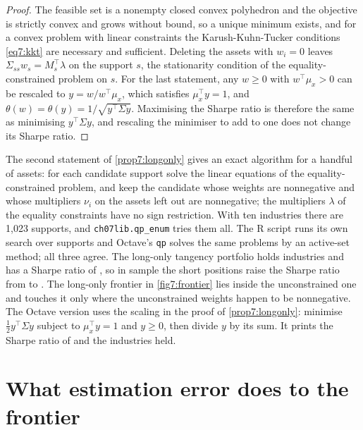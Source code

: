 \begin{chapterrefs}
\begin{proof}
The feasible set is a nonempty closed convex polyhedron and the objective is strictly convex and grows
without bound, so a unique minimum exists, and for a convex problem with linear constraints the
Karush-Kuhn-Tucker conditions \cref{eq7:kkt} are necessary and sufficient. Deleting the assets with
$w_i=0$ leaves $\Sigma_{ss}w_s=M_s^\top\lambda$ on the support $s$, the stationarity condition of the
equality-constrained problem on $s$. For the last statement, any $w\ge0$ with $w^\top\mu_x>0$ can be
rescaled to $y=w/w^\top\mu_x$, which satisfies $\mu_x^\top y=1$, and $\theta(w)=\theta(y)=1/\sqrt{y^\top\Sigma y}$.
Maximising the Sharpe ratio is therefore the same as minimising $y^\top\Sigma y$, and rescaling the
minimiser to add to one does not change its Sharpe ratio.
\end{proof}

The second statement of \cref{prop7:longonly} gives an exact algorithm for a handful of assets: for
each candidate support solve the linear equations of the equality-constrained problem, and keep the
candidate whose weights are nonnegative and whose multipliers $\nu_i$ on the assets left out are
nonnegative; the multipliers $\lambda$ of the equality constraints have no sign restriction. With ten industries there are 1,023
supports, and \texttt{ch07lib.qp\_enum} tries them all. The R script runs its own search over supports
and Octave's \texttt{qp} solves the same problems by an active-set method; all three agree. The
long-only tangency portfolio holds \frLoNword{} industries and has a Sharpe ratio of \frLoSR, so in
sample the short positions raise the Sharpe ratio from \frLoSR{} to \frTanSR. The long-only frontier in
\cref{fig7:frontier} lies inside the unconstrained one and touches it only where the unconstrained
weights happen to be nonnegative.
The Octave version uses the scaling in the proof of \cref{prop7:longonly}: minimise
$\frac12y^\top\Sigma y$ subject to $\mu_x^\top y=1$ and $y\ge0$, then divide $y$ by its sum. It prints
the Sharpe ratio of \frLoSR{} and the \frLoNword{} industries held.


\FloatBarrier
\section{What estimation error does to the frontier}
\label{sec7:estimation}


\end{chapterrefs}
